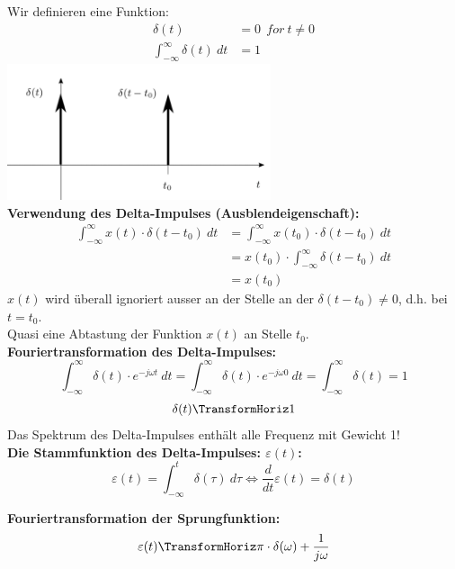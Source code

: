 \documentclass[12pt,a4paper]{scrartcl}
\begin{document}
  \noindent Wir definieren eine Funktion:
  \begin{equation}
    \label{eq:8}
    \begin{split}
    \delta (t) &= 0\ \ for\ t \neq 0 \\    
    \int_{-\infty}^{\infty} \delta (t)\ d t &= 1
    \end{split}
    \end{equation}
  \includegraphics[height=4cm]{Pictures/DeltaImpuls.png} \\

  \noindent  \textbf{Verwendung des Delta-Impulses (Ausblendeigenschaft):}
  \begin{equation}
    \label{eq:9}
    \begin{split}
    \int_{-\infty}^{\infty} x(t) \cdot \delta(t-t_0)\ d t &= \int_{-\infty}^{\infty} x(t_0) \cdot \delta (t-t_0)\ d t \\    
    &= x(t_0) \cdot \int_{-\infty}^{\infty} \delta (t-t_0)\ dt \\
    &=x(t_0)
    \end{split}
    \end{equation}
    \noindent $x(t)$ wird überall ignoriert ausser an der Stelle an der $\delta(t-t_0) \neq 0$, d.h. bei $t = t_0$.\\
    Quasi eine Abtastung der Funktion $x(t)$ an Stelle $t_0$.\\

    \noindent \textbf{Fouriertransformation des Delta-Impulses:}
    $$\int_{-\infty}^{\infty} \delta(t) \cdot e^{-j\omega t}\ dt = \int_{-\infty}^{\infty} \delta(t) \cdot e^{-j\omega 0}\ dt = \int_{-\infty}^{\infty} \delta(t) = 1$$
    $$\delta(t) \TransformHoriz 1 $$ 
    Das Spektrum des Delta-Impulses enthält alle Frequenz mit Gewicht 1! \\

    \noindent \textbf{Die Stammfunktion des Delta-Impulses: $\varepsilon(t)$:}
    $$\varepsilon (t) = \int_{-\infty}^{t} \delta(\tau)\ d \tau \Leftrightarrow  \frac{d}{dt} \varepsilon (t) = \delta (t) $$

     \noindent \textbf{Fouriertransformation der Sprungfunktion:}
     $$\varepsilon(t) \TransformHoriz \pi \cdot \delta(\omega) + \frac{1}{j\omega} $$
\end{document}
